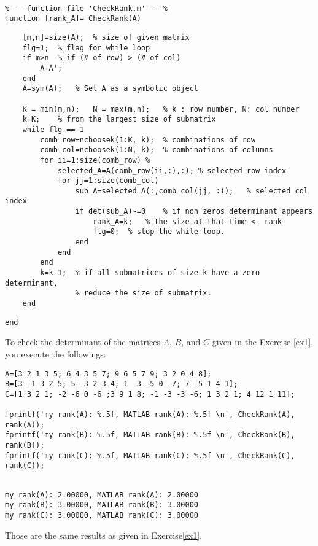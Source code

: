 \begin{sol}
\begin{verbatim}

%--- function file 'CheckRank.m' ---%
function [rank_A]= CheckRank(A)
\end{verbatim}

{\color{blue}
\begin{verbatim}
    [m,n]=size(A);  % size of given matrix
    flg=1;  % flag for while loop
    if m>n  % if (# of row) > (# of col)
        A=A';
    end
    A=sym(A);   % Set A as a symbolic object

    K = min(m,n);   N = max(m,n);   % k : row number, N: col number
    k=K;    % from the largest size of submatrix
    while flg == 1
        comb_row=nchoosek(1:K, k);  % combinations of row
        comb_col=nchoosek(1:N, k);  % combinations of columns
        for ii=1:size(comb_row) %
            selected_A=A(comb_row(ii,:),:); % selected row index
            for jj=1:size(comb_col)
                sub_A=selected_A(:,comb_col(jj, :));   % selected col index
                if det(sub_A)~=0    % if non zeros determinant appears
                    rank_A=k;   % the size at that time <- rank
                    flg=0;  % stop the while loop.
                end
            end
        end
        k=k-1;  % if all submatrices of size k have a zero determinant,
                % reduce the size of submatrix.
    end
\end{verbatim}}
\begin{verbatim}
end
\end{verbatim}


\noindent To check the determinant of the matrices $A$, $B$, and $C$ given in the Exercise \ref{ex1}, you execute the followings:
\begin{verbatim}
A=[3 2 1 3 5; 6 4 3 5 7; 9 6 5 7 9; 3 2 0 4 8];
B=[3 -1 3 2 5; 5 -3 2 3 4; 1 -3 -5 0 -7; 7 -5 1 4 1];
C=[1 3 2 1; -2 -6 0 -6 ;3 9 1 8; -1 -3 -3 -6; 1 3 2 1; 4 12 1 11];

fprintf('my rank(A): %.5f, MATLAB rank(A): %.5f \n', CheckRank(A), rank(A));
fprintf('my rank(B): %.5f, MATLAB rank(B): %.5f \n', CheckRank(B), rank(B));
fprintf('my rank(C): %.5f, MATLAB rank(C): %.5f \n', CheckRank(C), rank(C));
\end{verbatim}

\begin{outputs}
\begin{verbatim}

my rank(A): 2.00000, MATLAB rank(A): 2.00000
my rank(B): 3.00000, MATLAB rank(B): 3.00000
my rank(C): 3.00000, MATLAB rank(C): 3.00000
\end{verbatim}
\end{outputs}

\noindent Those are the same results as given in Exercise\ref{ex1}.

\end{sol}


